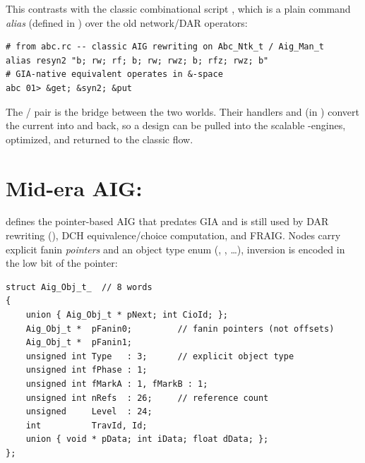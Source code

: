 This contrasts with the classic combinational script , which is a
plain command \emph{alias} (defined in ) over the old
network/DAR operators:

\begin{lstlisting}[style=abcshell]
# from abc.rc -- classic AIG rewriting on Abc_Ntk_t / Aig_Man_t
alias resyn2 "b; rw; rf; b; rw; rwz; b; rfz; rwz; b"
# GIA-native equivalent operates in &-space
abc 01> &get; &syn2; &put
\end{lstlisting}

The  /  pair is the bridge between the two worlds. Their
handlers  and  (in
) convert the current  into
 and back, so a design can be pulled into the scalable
\cmd{\&}-engines, optimized, and returned to the classic flow.

\section{Mid-era AIG: }

 defines the pointer-based AIG that predates GIA and is
still used by DAR rewriting (), DCH equivalence/choice computation, and
FRAIG. Nodes carry explicit fanin \emph{pointers} and an object type enum
(, , \dots), inversion is encoded in the low bit
of the pointer:

\begin{lstlisting}[style=abccode]
struct Aig_Obj_t_  // 8 words
{
    union { Aig_Obj_t * pNext; int CioId; };
    Aig_Obj_t *  pFanin0;         // fanin pointers (not offsets)
    Aig_Obj_t *  pFanin1;
    unsigned int Type   : 3;      // explicit object type
    unsigned int fPhase : 1;
    unsigned int fMarkA : 1, fMarkB : 1;
    unsigned int nRefs  : 26;     // reference count
    unsigned     Level  : 24;
    int          TravId, Id;
    union { void * pData; int iData; float dData; };
};
\end{lstlisting}

